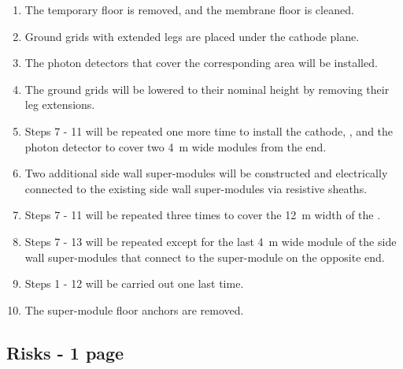 \begin{enumerate}
    \item The temporary floor is removed, and the membrane floor is cleaned.
    \item Ground grids with extended legs are placed under the cathode plane.
    \item The photon detectors that cover the corresponding area will be installed.
    \item The ground grids will be lowered to their nominal height by removing their leg extensions.
    \item Steps 7 - 11 will be repeated one more time to install the cathode, , and the photon detector to cover two \SI{4}{\m} wide modules from the end.
    \item Two additional side wall super-modules will be constructed and electrically connected to the existing side wall super-modules via resistive sheaths.
    \item Steps 7 - 11 will be repeated three times to cover the \SI{12}{\m} width of the .
    \item Steps 7 - 13 will be repeated except for the last \SI{4}{\m} wide module of the side wall super-modules that connect to the \endwall super-module on the opposite end.
    \item Steps 1 - 12 will be carried out one last time.
    \item The \endwall super-module floor anchors are removed.
\end{enumerate}



\subsection{Risks - 1 page}
\label{sec:fddp-hv-org-risk-1pg}

